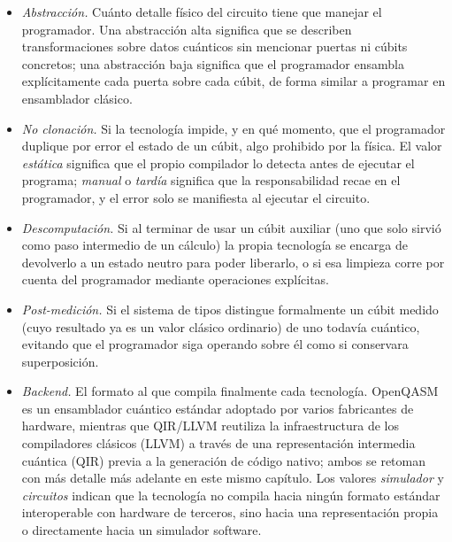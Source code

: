 \begin{itemize}
  \item \textit{Abstracción.} Cuánto detalle físico del circuito tiene que manejar el programador. Una abstracción alta significa que se describen transformaciones sobre datos cuánticos sin mencionar puertas ni cúbits concretos; una abstracción baja significa que el programador ensambla explícitamente cada puerta sobre cada cúbit, de forma similar a programar en ensamblador clásico.

  \item \textit{No clonación.} Si la tecnología impide, y en qué momento, que el programador duplique por error el estado de un cúbit, algo prohibido por la física. El valor \textit{estática} significa que el propio compilador lo detecta antes de ejecutar el programa; \textit{manual} o \textit{tardía} significa que la responsabilidad recae en el programador, y el error solo se manifiesta al ejecutar el circuito.

  \item \textit{Descomputación.} Si al terminar de usar un cúbit auxiliar (uno que solo sirvió como paso intermedio de un cálculo) la propia tecnología se encarga de devolverlo a un estado neutro para poder liberarlo, o si esa limpieza corre por cuenta del programador mediante operaciones explícitas.

  \item \textit{Post-medición.} Si el sistema de tipos distingue formalmente un cúbit medido (cuyo resultado ya es un valor clásico ordinario) de uno todavía cuántico, evitando que el programador siga operando sobre él como si conservara superposición.

  \item \textit{Backend.} El formato al que compila finalmente cada tecnología. OpenQASM es un ensamblador cuántico estándar adoptado por varios fabricantes de hardware, mientras que QIR/LLVM reutiliza la infraestructura de los compiladores clásicos (LLVM) a través de una representación intermedia cuántica (QIR) previa a la generación de código nativo; ambos se retoman con más detalle más adelante en este mismo capítulo. Los valores \textit{simulador} y \textit{circuitos} indican que la tecnología no compila hacia ningún formato estándar interoperable con hardware de terceros, sino hacia una representación propia o directamente hacia un simulador software.
\end{itemize}

